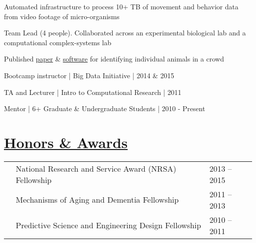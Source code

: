 \documentclass[]{winter-resume-openfont}
\begin{document}
\begin{minipage}[t]{0.65\textwidth}
\sectionsep

\begin{tightemize}
\item Automated infrastructure to process 10+ TB of movement and behavior data from video footage of micro-organisms
\item Team Lead (4 people).  Collaborated across an experimental biological lab and a computational complex-systems lab
\item  Published  \href{http://www.nature.com/articles/srep34859}{paper}  \& \href{https://amaral.northwestern.edu/resources/software/waldo}{software} for identifying individual animals in a crowd
\end{tightemize}

\sectionsep


\begin{tightemize}
\item Bootcamp instructor | Big Data Initiative | 2014 \& 2015
\item TA and Lecturer  | Intro to Computational Research | 2011
\item  Mentor | 6+ Graduate \& Undergraduate Students | 2010 - Present
\end{tightemize}

\sectionsep


\section{\underline{Honors \& Awards}}
\begin{tabular}{lll}
\textbullet{}   & National Research and Service Award (NRSA) Fellowship & 2013 – 2015	\\
\textbullet{}   & Mechanisms of Aging and Dementia Fellowship & 2011 – 2013\\
\textbullet{}  &Predictive Science and Engineering Design Fellowship & 2010 – 2011\\
\end{tabular}
\sectionsep





\end{minipage}
\end{document}
